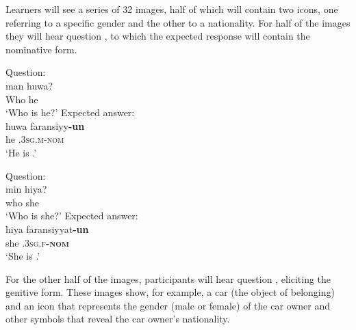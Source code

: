 \documentclass[output=paper,colorlinks,citecolor=brown,modfonts,nonflat]{../langscibook}
\begin{document}
Learners will see a series of 32 images, half of which will contain two icons, one referring to a specific gender and the other to a nationality. For half of the images they will hear question , to which the expected response will contain the nominative form.

\ea%
    \label{ex:watorek:18}
    \ea%
        \label{ex:watorek:18a}
        \ea
            Question: \\
            \gll    man huwa?\\
                    Who  he\\
            \glt    ‘Who is he?’
        \ex%
        \label{ex:watorek:18b}
            Expected answer:\\
            \gll     huwa faransiyy\textbf{{-un}}\\
                    he \textsc{.3sg.m{-nom}}\\
            \glt    ‘He is .’
        \z
        \ex \label{ex:watorek:18c}
        \ea%

            Question:\\
            \gll     min hiya?\\
                    who she\\
            \glt    ‘Who is she?’
        \ex%
        \label{ex:watorek:18d}
            Expected answer: \\
            \gll    hiya faransiyyat\textbf{{-un}}\\
                    she \textsc{.3sg.f\textbf{-nom}}\\
            \glt    ‘She is .’
        \z
    \z
\z

For the other half of the images, participants will hear question , eliciting the genitive form. These images show, for example, a car (the object of belonging) and an icon that represents the gender (male or female) of the car owner and other symbols that reveal the car owner’s nationality.
\end{document}
